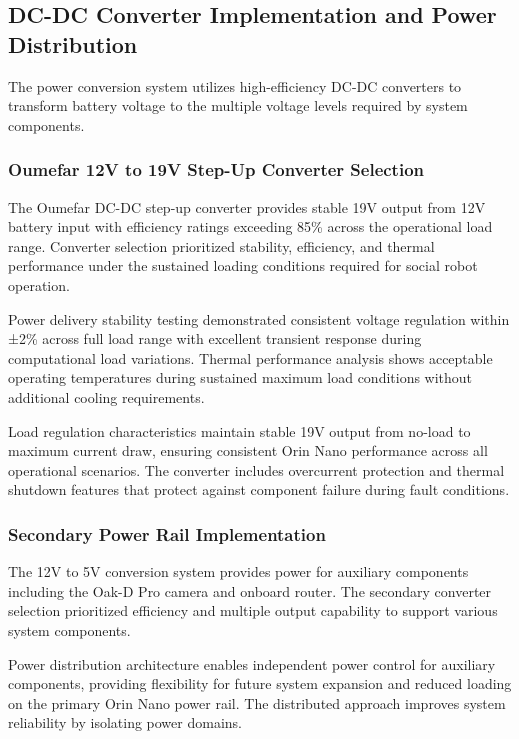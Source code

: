 \subsection{DC-DC Converter Implementation and Power Distribution}

The power conversion system utilizes high-efficiency DC-DC converters to transform battery voltage to the multiple voltage levels required by system components.

\subsubsection{Oumefar 12V to 19V Step-Up Converter Selection}

The Oumefar DC-DC step-up converter provides stable 19V output from 12V battery input with efficiency ratings exceeding 85\% across the operational load range. Converter selection prioritized stability, efficiency, and thermal performance under the sustained loading conditions required for social robot operation.

Power delivery stability testing demonstrated consistent voltage regulation within ±2\% across full load range with excellent transient response during computational load variations. Thermal performance analysis shows acceptable operating temperatures during sustained maximum load conditions without additional cooling requirements.

Load regulation characteristics maintain stable 19V output from no-load to maximum current draw, ensuring consistent Orin Nano performance across all operational scenarios. The converter includes overcurrent protection and thermal shutdown features that protect against component failure during fault conditions.

\subsubsection{Secondary Power Rail Implementation}

The 12V to 5V conversion system provides power for auxiliary components including the Oak-D Pro camera and onboard router. The secondary converter selection prioritized efficiency and multiple output capability to support various system components.

Power distribution architecture enables independent power control for auxiliary components, providing flexibility for future system expansion and reduced loading on the primary Orin Nano power rail. The distributed approach improves system reliability by isolating power domains.

